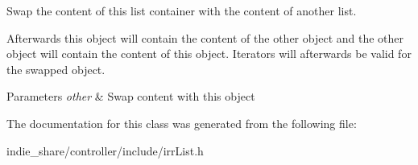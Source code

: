 Swap the content of this list container with the content of another list. 

Afterwards this object will contain the content of the other object and the other object will contain the content of this object. Iterators will afterwards be valid for the swapped object. 
\begin{DoxyParams}{Parameters}
{\em other} & Swap content with this object \\
\hline
\end{DoxyParams}


The documentation for this class was generated from the following file\+:\begin{DoxyCompactItemize}
\item 
indie\+\_\+share/controller/include/irr\+List.\+h\end{DoxyCompactItemize}
